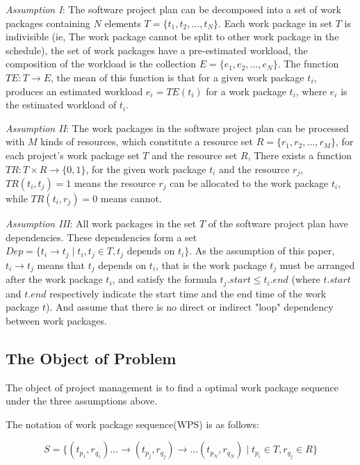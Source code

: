 \emph{Assumption I}: The software project plan can be decomposed into a set of
work packages containing $N$ elements $T = \{t_1, t_2, ..., t_N \}$.
Each work package in set $T$ is indivisible (ie, The work package cannot be
split to other work package in the schedule), the set of work packages have a
pre-estimated workload, the composition of the workload is the collection
$E = \{e _1, e_2, ..., e_N \}$. The function $TE: T \rightarrow E$,
the mean of this function is that for a given work package $t_i$, produces an
estimated workload $e_i = TE(t_i)$ for a work package $t_i$, where $e_i$ is the
estimated workload of $t_i$.


\emph{Assumption II}: The work packages in the software project plan can be
processed with $M$ kinds of resources, which constitute a resource set
$R = \{r_1, r_2, ..., r_M \}$, for each project's work package set $T$ and the
resource set $R$, There exists a function $TR: T \times R \rightarrow \{0, 1\}$,
for the given work package $t_i$ and the resource $r_j$, $TR(t_i, t_j) = 1$
means the resource $r_j$ can be allocated to the work package $t_i$, while
$TR(t_i, r_j) = 0$ means cannot.


\emph{Assumption III}: All work packages in the set $T$ of the software project
plan have dependencies. These dependencies form a set
$Dep= \{t_i \rightarrow t_j \mid t_i, t_j \in T, t_j \text{ depends on } t_i\}$.
As the assumption of this paper, $t_i \rightarrow t_j$ means that $t_j$ depends
on $t_i$, that is the work package $t_j$ must be arranged after the work
package $t_i$, and satisfy the formula $t_j.start \leq t_i.end$ (where $t.start$
and $t.end$ respectively indicate the start time and the end time of the work
package $t$).  And assume that there is no direct or indirect "loop" dependency
between work packages.


\subsection{The Object of Problem}
%
The object of project management is to find a optimal work package sequence
under the three assumptions above.

The notation of work package sequence(WPS) is as follows:

\begin{equation}
  S = \{
  (t_{p_1}, r_{q_1}) ... \rightarrow (t_{p_j}, r_{q_j}) \rightarrow ... (t_{p_N}, r_{q_N})
  \mid t_{p_i} \in T, r_{q_j} \in R
  \}
  \label{wps}
\end{equation}

